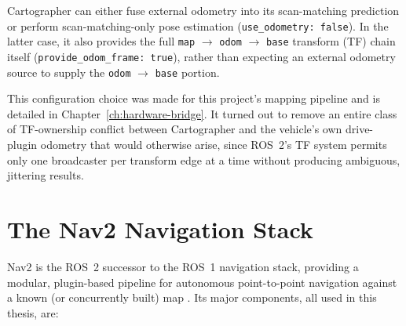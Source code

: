 Cartographer can either fuse external odometry into its
scan-matching prediction or perform scan-matching-only pose
estimation (\texttt{use\_odometry: false}). In the latter case, it
also provides the full \texttt{map} $\rightarrow$ \texttt{odom}
$\rightarrow$ \texttt{base} transform (TF) chain itself
(\texttt{provide\_odom\_frame: true}), rather than expecting an
external odometry source to supply the \texttt{odom} $\rightarrow$
\texttt{base} portion.

This configuration choice was made for this project's mapping
pipeline and is detailed in Chapter~\ref{ch:hardware-bridge}. It
turned out to remove an entire class of TF-ownership conflict
between Cartographer and the vehicle's own drive-plugin odometry
that would otherwise arise, since ROS~2's TF system permits only one
broadcaster per transform edge at a time without producing
ambiguous, jittering results.

\section{The Nav2 Navigation Stack}
\label{sec:nav2}

Nav2 is the ROS~2 successor to the ROS~1 navigation stack, providing
a modular, plugin-based pipeline for autonomous point-to-point
navigation against a known (or concurrently built) map
\cite{macenski2020nav2}. Its major components, all used in this
thesis, are:

